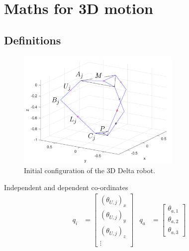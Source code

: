 \section{Maths for 3D motion}
\subsection{Definitions}
\begin{figure}[h!]
	\centering
	\includegraphics[width=0.7\textwidth]{figures/Initial_3D.png}                                                              
	\caption[Initial configuration of the 3D Delta robot]{Initial configuration of the 3D Delta robot.}
	\label{fig:initia3D}
\end{figure}

Independent and dependent co-ordinates
\begin{align}
q_i&=
\begin{bmatrix}
(\theta_{U,j})_x \\
(\theta_{U,j})_y \\
(\theta_{U,j})_z \\
\vdots
\end{bmatrix} &
q_a&=
\begin{bmatrix}
\theta_{a,1} \\
\theta_{a,2} \\
\theta_{a,3}
\end{bmatrix}
\end{align}

